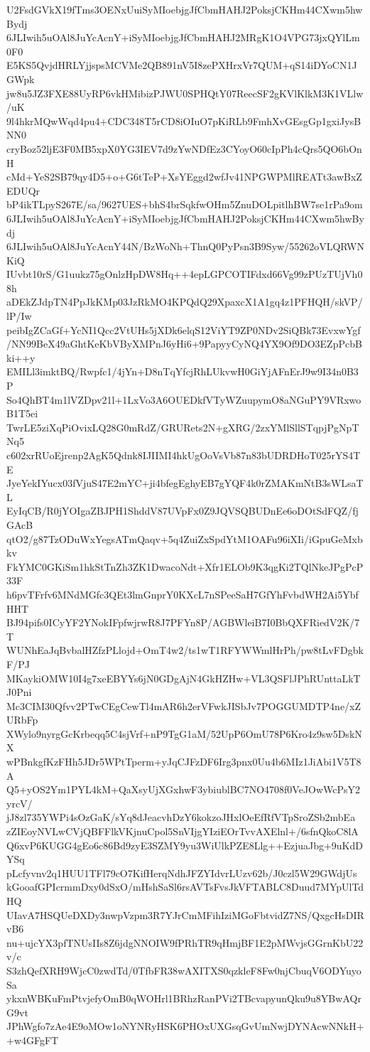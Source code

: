 U2FsdGVkX19fTms3OENxUuiSyMIoebjgJfCbmHAHJ2PoksjCKHm44CXwm5hwBydj
6JLIwih5uOAl8JuYcAcnY+iSyMIoebjgJfCbmHAHJ2MRgK1O4VPG73jxQYlLm0F0
E5KS5QvjdHRLYjjspsMCVMe2QB891nV5I8zePXHrxVr7QUM+qS14iDYoCN1JGWpk
jw8u5JZ3FXE88UyRP6vkHMibizPJWU0SPHQtY07ReecSF2gKVlKlkM3K1VLlw/uK
9l4hkrMQwWqd4pu4+CDC348T5rCD8iOIuO7pKiRLb9FmhXvGEsgGp1gxiJysBNN0
cryBoz52ljE3F0MB5xpX0YG3IEV7d9zYwNDfEz3CYoyO60cIpPh4cQrs5QO6bOnH
cMd+YeS2SB79qy4D5+o+G6tTeP+XsYEggd2wfJv41NPGWPMlREATt3awBxZEDUQr
bP4ikTLpyS267E/sa/9627UES+bhS4brSqkfwOHm5ZnuDOLpitlhBW7se1rPa9om
6JLIwih5uOAl8JuYcAcnY+iSyMIoebjgJfCbmHAHJ2PoksjCKHm44CXwm5hwBydj
6JLIwih5uOAl8JuYcAcnY44N/BzWoNh+ThnQ0PyPsn3B9Syw/55262oVLQRWNKiQ
IUvbt10rS/G1uukz75gOnlzHpDW8Hq++4epLGPCOTIFdxd66Vg99zPUzTUjVh08h
aDEkZJdpTN4PpJkKMp03JzRkMO4KPQdQ29XpaxcX1A1gq4z1PFHQH/skVP/lP/Iw
peibIgZCaGf+YcNI1Qcc2VtUHs5jXDk6elqS12ViYT9ZP0NDv2SiQBk73EvxwYgf
/NN99BeX49aGhtKeKbVByXMPnJ6yHi6+9PapyyCyNQ4YX9Of9DO3EZpPcbBki++y
EMILl3imktBQ/Rwpfc1/4jYn+D8nTqYfcjRhLUkvwH0GiYjAFnErJ9w9I34n0B3P
So4QhBT4m1lVZDpv21l+1LxVo3A6OUEDkfVTyWZuupymO8aNGuPY9VRxwoB1T5ei
TwrLE5ziXqPiOvixLQ28G0mRdZ/GRURets2N+gXRG/2zxYMlSllSTqpjPgNpTNq5
c602xrRUoEjrenp2AgK5Qdnk8IJIIMI4hkUgOoVsVb87n83bUDRDHoT025rYS4TE
JyeYekIYucx03fVjuS47E2mYC+ji4bfegEghyEB7gYQF4k0rZMAKmNtB3sWLsaTL
EyIqCB/R0jYOIgaZBJPH1ShddV87UVpFx0Z9JQVSQBUDnEe6oDOtSdFQZ/fjGAcB
qtO2/g87TzODuWxYegsATmQaqv+5q4ZuiZxSpdYtM1OAFu96iXIi/iGpuGeMxbkv
FkYMC0GKiSm1hkStTnZh3ZK1DwacoNdt+Xfr1ELOb9K3qgKi2TQlNkeJPgPcP33F
h6pvTFrfv6MNdMGfc3QEt3lmGnprY0KXcL7nSPeeSaH7GfYhFvbdWH2Ai5YbfHHT
BJ94pifs0ICyYF2YNokIFpfwjrwR8J7PFYn8P/AGBWleiB7I0BbQXFRiedV2K/7T
WUNhEaJqBvbalHZfzPLlojd+OmT4w2/ts1wT1RFYWWmlHrPh/pw8tLvFDgbkF/PJ
MKaykiOMW10I4g7xeEBYYs6jN0GDgAjN4GkHZHw+VL3QSFlJPhRUnttaLkTJ0Pni
Mc3CIM30Qfvv2PTwCEgCewTl4mAR6h2erVFwkJISbJv7POGGUMDTP4ne/xZURbFp
XWylo9nyrgGcKrbeqq5C4sjVrf+nP9TgG1aM/52UpP6OmU78P6Kro4z9sw5DskNX
wPBnkgfKzFHh5JDr5WPtTperm+yJqCJFzDF6Irg3pnx0Uu4b6MIz1JiAbi1V5T8A
Q5+yOS2Ym1PYL4kM+QaXsyUjXGxhwF3ybiublBC7NO4708f0VeJOwWcPsY2yrcV/
jJ8zl735YWPi4sOzGaK/sYq8dJeacvhDzY6kokzoJHxlOeEfRfVTpSroZSb2mbEa
zZIEoyNVLwCVjQBFFlkVKjnuCpol5SnVIjgYIziEOrTvvAXElnl+/6sfnQkoC8lA
Q6xvP6KUGG4gEo6c86Bd9zyE3SZMY9yu3WiUlkPZE8Llg++EzjuaJbg+9uKdDYSq
pLcfyvnv2q1HUU1TFl79cO7KifHerqNdhJFZYIdvrLUzv62b/J0czl5W29GWdjUs
kGooafGPIcrmmDxy0dSxO/mHshSaSl6rsAVTsFvsJkVFTABLC8Duud7MYpUlTdHQ
UIavA7HSQUeDXDy3nwpVzpm3R7YJrCmMFihIziMGoFbtvidZ7NS/QxgcHsDIRvB6
nu+ujcYX3pfTNUsIIs8Z6jdgNNOIW9fPRhTR9qHmjBF1E2pMWvjsGGrnKbU22v/c
S3zhQefXRH9WjcC0zwdTd/0TfbFR38wAXITXS0qzkleF8Fw0njCbuqV6ODYuyoSa
ykxnWBKuFmPtvjefyOmB0qWOHrl1BRhzRanPVi2TBcvapyunQku9u8YBwAQrG9vt
JPhWgfo7zAe4E9oMOw1oNYNRyHSK6PHOxUXGsqGvUmNwjDYNAcwNNkH++w4GFgFT
